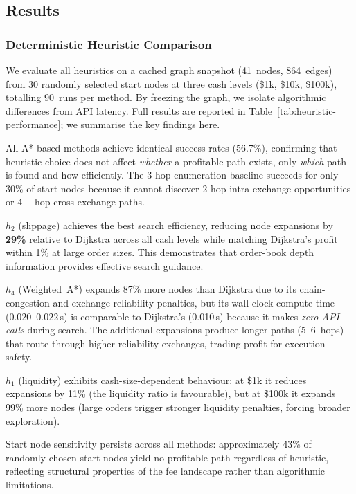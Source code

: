 \subsection{Results}

\subsubsection{Deterministic Heuristic Comparison}

We evaluate all heuristics on a cached graph snapshot (41~nodes, 864~edges) from 30 randomly selected start nodes at three cash levels (\$1k, \$10k, \$100k), totalling 90~runs per method. By freezing the graph, we isolate algorithmic differences from API latency. Full results are reported in Table~\ref{tab:heuristic-performance}; we summarise the key findings here.

All A*-based methods achieve identical success rates (56.7\%), confirming that heuristic choice does not affect \emph{whether} a profitable path exists, only \emph{which} path is found and how efficiently. The 3-hop enumeration baseline succeeds for only 30\% of start nodes because it cannot discover 2-hop intra-exchange opportunities or 4+~hop cross-exchange paths.

$h_2$ (slippage) achieves the best search efficiency, reducing node expansions by \textbf{29\%} relative to Dijkstra across all cash levels while matching Dijkstra's profit within 1\% at large order sizes. This demonstrates that order-book depth information provides effective search guidance.

$h_4$ (Weighted~A*) expands 87\% more nodes than Dijkstra due to its chain-congestion and exchange-reliability penalties, but its wall-clock compute time (0.020--0.022\,s) is comparable to Dijkstra's (0.010\,s) because it makes \emph{zero API calls} during search. The additional expansions produce longer paths (5--6~hops) that route through higher-reliability exchanges, trading profit for execution safety.

$h_1$ (liquidity) exhibits cash-size-dependent behaviour: at \$1k it reduces expansions by 11\% (the liquidity ratio is favourable), but at \$100k it expands 99\% more nodes (large orders trigger stronger liquidity penalties, forcing broader exploration).

Start node sensitivity persists across all methods: approximately 43\% of randomly chosen start nodes yield no profitable path regardless of heuristic, reflecting structural properties of the fee landscape rather than algorithmic limitations.

